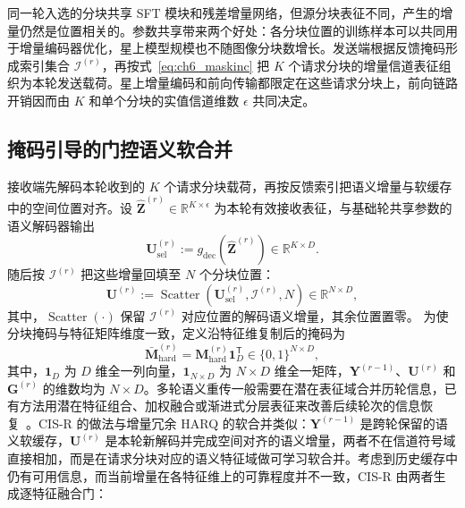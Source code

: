 同一轮入选的分块共享 SFT 模块和残差增量网络，但源分块表征不同，产生的增量仍然是位置相关的。参数共享带来两个好处：各分块位置的训练样本可以共同用于增量编码器优化，星上模型规模也不随图像分块数增长。发送端根据反馈掩码形成索引集合 $\mathcal I^{(r)}$，再按式~\eqref{eq:ch6_maskinc} 把 $K$ 个请求分块的增量信道表征组织为本轮发送载荷。星上增量编码和前向传输都限定在这些请求分块上，前向链路开销因而由 $K$ 和单个分块的实值信道维数 $\epsilon$ 共同决定。

\subsection{掩码引导的门控语义软合并}
\label{subsec:ch6_accum}

接收端先解码本轮收到的 $K$ 个请求分块载荷，再按反馈索引把语义增量与软缓存中的空间位置对齐。设 $\hat{\mathbf Z}^{(r)}\in\mathbb R^{K\times\epsilon}$ 为本轮有效接收表征，与基础轮共享参数的语义解码器输出
\begin{equation}\label{eq:ch6_increment_decode}
\mathbf U_{\mathrm{sel}}^{(r)}
:=g_{\mathrm{dec}}\!\left(\hat{\mathbf Z}^{(r)}\right)
\in\mathbb R^{K\times D}.
\end{equation}
随后按 $\mathcal I^{(r)}$ 把这些增量回填至 $N$ 个分块位置：
\begin{equation}\label{eq:ch6_increment_scatter}
\mathbf U^{(r)}
:=\operatorname{Scatter}\!\left(
\mathbf U_{\mathrm{sel}}^{(r)},\mathcal I^{(r)},N
\right)
\in\mathbb R^{N\times D},
\end{equation}
其中，$\operatorname{Scatter}(\cdot)$ 保留 $\mathcal I^{(r)}$ 对应位置的解码语义增量，其余位置置零。
为使分块掩码与特征矩阵维度一致，定义沿特征维复制后的掩码为
\begin{equation}\label{eq:ch6_mask_broadcast}
\bar{\mathbf M}_{\mathrm{hard}}^{(r)}
=\mathbf M_{\mathrm{hard}}^{(r)}\mathbf 1_D^{\mathsf T}
\in\{0,1\}^{N\times D},
\end{equation}
其中，$\mathbf 1_D$ 为 $D$ 维全一列向量，$\mathbf 1_{N\times D}$ 为 $N\times D$ 维全一矩阵，$\mathbf Y^{(r-1)}$、$\mathbf U^{(r)}$ 和 $\mathbf G^{(r)}$ 的维数均为 $N\times D$。多轮语义重传一般需要在潜在表征域合并历轮信息，已有方法用潜在特征组合、加权融合或渐进式分层表征来改善后续轮次的信息恢复~\cite{han-GenerativeSemanticHARQ-arXiv2026,li2026semantic,zhang2025progressive}。CIS-R 的做法与增量冗余 HARQ 的软合并类似：$\mathbf Y^{(r-1)}$ 是跨轮保留的语义软缓存，$\mathbf U^{(r)}$ 是本轮新解码并完成空间对齐的语义增量，两者不在信道符号域直接相加，而是在请求分块对应的语义特征域做可学习软合并。考虑到历史缓存中仍有可用信息，而当前增量在各特征维上的可靠程度并不一致，CIS-R 由两者生成逐特征融合门：
